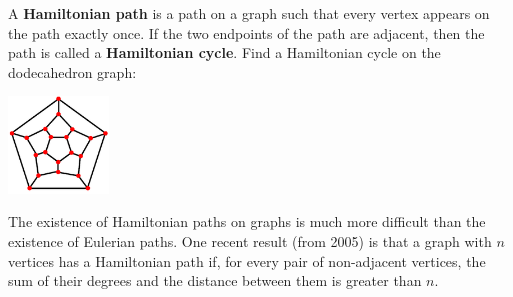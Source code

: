 \begin{questions}
  \question A \textbf{Hamiltonian path} is a path on a graph such that every vertex appears on the path exactly once. If the two endpoints
            of the path are adjacent, then the path is called a \textbf{Hamiltonian cycle}. Find a Hamiltonian cycle on the dodecahedron graph:
            \begin{center}
              \includegraphics[width=0.2\textwidth]{dodec}
            \end{center}
            The existence of Hamiltonian paths on graphs is much more difficult than the existence of Eulerian paths. One recent result (from
            2005) is that a graph with $n$ vertices has a Hamiltonian path if, for every pair of non-adjacent vertices, the sum of their degrees
            and the distance between them is greater than $n$.
\end{questions}


